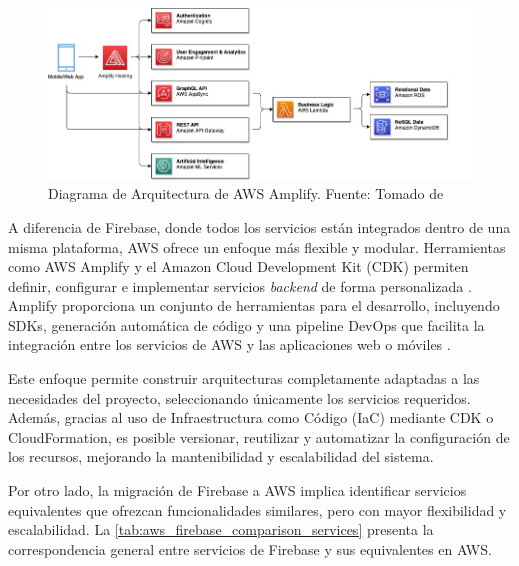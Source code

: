 \begin{figure}[H]
  \centering
  \includegraphics[width=1\textwidth]{img/figures/fig4-amplify-architecture.png}
  \caption{Diagrama de Arquitectura de AWS Amplify. Fuente: Tomado de \cite{Michael2021}}
  \label{fig:amplify_architecture}
\end{figure}

A diferencia de Firebase, donde todos los servicios están integrados dentro de una misma plataforma, AWS ofrece un enfoque más flexible y modular. Herramientas como AWS Amplify y el Amazon Cloud Development Kit (CDK) permiten definir, configurar e implementar servicios \textit{backend} de forma personalizada \cite{Michael2021}. Amplify proporciona un conjunto de herramientas para el desarrollo, incluyendo SDKs, generación automática de código y una pipeline DevOps que facilita la integración entre los servicios de AWS y las aplicaciones web o móviles \cite{Michael2021}.

Este enfoque permite construir arquitecturas completamente adaptadas a las necesidades del proyecto, seleccionando únicamente los servicios requeridos. Además, gracias al uso de Infraestructura como Código (IaC) mediante CDK o CloudFormation, es posible versionar, reutilizar y automatizar la configuración de los recursos, mejorando la mantenibilidad y escalabilidad del sistema.

Por otro lado, la migración de Firebase a AWS implica identificar servicios equivalentes que ofrezcan funcionalidades similares, pero con mayor flexibilidad y escalabilidad. La \autoref{tab:aws_firebase_comparison_services} presenta la correspondencia general entre servicios de Firebase y sus equivalentes en AWS.

